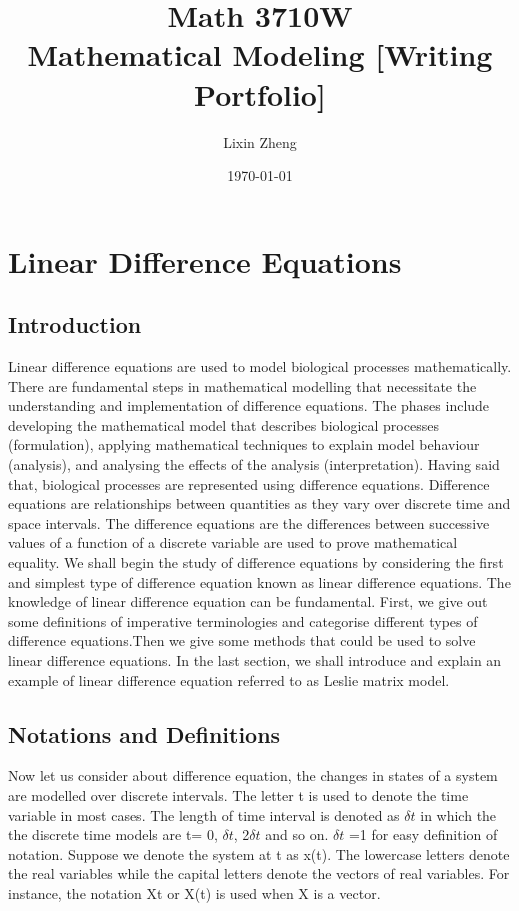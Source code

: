 \documentclass[12pt]{article}
\title{{\bf{Math 3710W}} \\ Mathematical Modeling [Writing Portfolio]}
\author{Lixin Zheng}
\date{\today}
\begin{document}
\maketitle
\section{Linear Difference Equations}

\subsection{Introduction}

Linear difference equations are used to model biological processes mathematically. There are fundamental steps in mathematical modelling that necessitate the understanding and implementation of difference equations. The phases include developing the mathematical model that describes biological processes (formulation), applying mathematical techniques to explain model behaviour (analysis), and analysing the effects of the analysis (interpretation). Having said that, biological processes are represented using difference equations.
Difference equations are relationships between quantities as they vary over discrete time and space intervals. The difference equations are the differences between successive values of a function of a discrete variable are used to prove mathematical equality. 
We shall begin the study of difference equations by considering the first and simplest type of difference equation known as linear difference equations. The knowledge of linear difference equation can be fundamental. First, we give out some definitions of imperative terminologies and categorise different types of difference equations.Then we give some methods that could be used to solve linear difference equations. In the last section, we shall introduce and explain an example of linear difference equation referred to as Leslie matrix model. 
 

\subsection{Notations and Definitions}

Now let us consider about difference equation, the changes in states of a system are modelled over discrete intervals. The letter t is used to denote the time variable in most cases. The length of time interval is denoted as $\delta{t}$ in which the the discrete time models are t= 0, $\delta{t}$, 2$\delta{t}$ and so on. $\delta{t}$ =1 for easy definition of notation.
Suppose we denote the system at t as x(t). The lowercase letters denote the real variables while the capital letters denote the vectors of real variables. For instance, the notation Xt or X(t) is used when X is a vector. 
\end{document}
